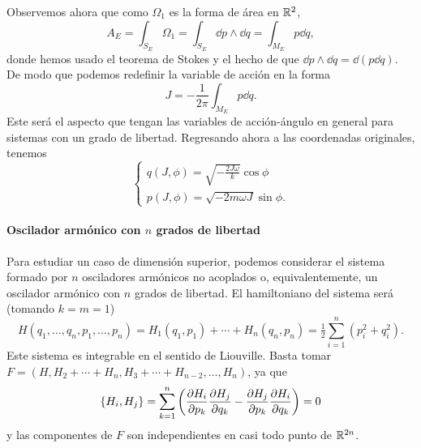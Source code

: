   Observemos ahora que como $\Omega_1$ es la forma de área en $\mathbb{R}^2$, 
  \begin{equation*}
    A_E=\int_{S_E}\Omega_1 = \int_{S_E} \dd p \wedge \dd q = \int_{M_E}p\dd q,
\end{equation*}
donde hemos usado el teorema de Stokes y el hecho de que $\dd p \wedge \dd q= \dd(p\dd q)$. De modo que podemos redefinir la variable de acción en la forma
\begin{equation*}
  J=-\frac{1}{2\pi}\int_{M_E}p \dd q.
\end{equation*}
Este será el aspecto que tengan las variables de acción-ángulo en general para sistemas con un grado de libertad. Regresando ahora a las coordenadas originales, tenemos
\begin{equation*}
  \begin{cases}
    q(J,\phi)=\sqrt{-\frac{2J\omega}{ k}}\cos \phi\\
    p(J,\phi)=\sqrt{-2m\omega J}\sin \phi.
  \end{cases}
\end{equation*}

\paragraph{\bf Oscilador armónico con $n$ grados de libertad}\mbox{}

  Para estudiar un caso de dimensión superior, podemos considerar el sistema formado por $n$ osciladores armónicos no acoplados o, equivalentemente, un oscilador armónico con $n$ grados de libertad. El hamiltoniano del sistema será (tomando $k=m=1$)
  \begin{equation*}
    H(q_1,\dots,q_n,p_1,\dots,p_n)= H_1(q_1,p_1)+ \cdots +H_n(q_n,p_n) = \tfrac{1}{2}\sum_{i=1}^n (p_i^2+q_i^2).
  \end{equation*}
  Este sistema es integrable en el sentido de Liouville. Basta tomar $F=(H,H_2+\cdots+H_{n},H_3+\cdots+H_{n-2},\dots,H_n)$, ya que 
  \begin{equation*}
    \left\lbrace H_i,H_j\right\rbrace = \sum_{k=1}^n\left( \frac{\partial H_i}{\partial p_k}\frac{\partial H_j}{\partial q_k} - \frac{\partial H_j}{\partial p_k}\frac{\partial H_i}{\partial q_k}\right)=0
  \end{equation*}
  y las componentes de $F$ son independientes en casi todo punto de $\mathbb{R}^{2n}$. 
  
